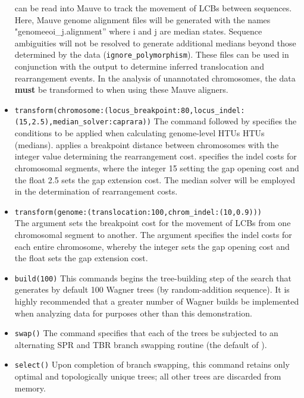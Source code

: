 \begin{itemize}
can be read into Mauve to track the movement of LCBs between sequences. Here, Mauve genome alignment files will be generated 
with the names "genomeeoi\_j.alignment'' where i and j are median states. Sequence ambiguities will not be resolved to generate 
additional medians beyond those determined by the data (\texttt{ignore\_polymorphism}). These files can be used in 
conjunction with the  output to determine inferred translocation and rearrangement events. 
In the analysis of unannotated chromosomes, the data {\bf must} be transformed to 
when using these Mauve aligners.
\item \texttt{transform(chromosome:(locus\_breakpoint:80,locus\_indel:\\(15,2.5),median\_solver:caprara))}  The command 
 followed by  specifies the conditions to be 
applied when calculating genome-level HTUs HTUs (medians).  
applies a breakpoint distance between chromosomes with the integer value determining the rearrangement cost. 
 specifies the indel costs for chromosomal segments, where the integer 15 
setting the gap opening cost and the float 2.5 sets the gap extension cost. The median solver 
will be employed in the determination of rearrangement costs.
\item \texttt{transform(genome:(translocation:100,chrom\_indel:(10,0.9)))} \\ The argument  
sets the breakpoint cost for the movement of LCBs from one chromosomal segment to another. The 
argument  specifies the indel costs for each entire chromosome, whereby the 
integer sets the gap opening cost and the float sets the gap extension cost.  
\item \texttt{build(100)} This commands begins the tree-building step of the search that generates by default 100 Wagner trees 
(by random-addition sequence).  It is highly recommended that a greater number of Wagner builds be implemented when analyzing 
data for purposes other than this demonstration.
\item \texttt{swap()} The  command specifies that each of the trees be subjected to an alternating 
SPR and TBR branch swapping routine (the default of \poy).
\item \texttt{select()} Upon completion of branch swapping, this command retains only optimal and topologically 
unique trees; all other trees are discarded from memory.

\end{itemize}
